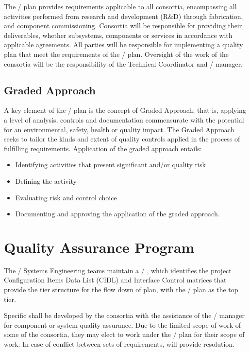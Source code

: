 The /  plan provides   requirements
applicable to all consortia, encompassing all activities performed
from research and development (R\&D) through fabrication, and component
commissioning. Consortia will be responsible for providing their
deliverables, whether subsystems, components or services in accordance
with applicable agreements. All parties will be responsible for
implementing a quality plan that meet the requirements of the
/  plan. Oversight of the work of the consortia will be
the responsibility of the  Technical Coordinator and /  manager.

\subsection{Graded Approach}

A key element of the /  plan is the concept of Graded
Approach; that is, applying a level of analysis, controls and
documentation commensurate with the potential for an environmental,
safety, health or quality impact. The Graded Approach seeks to tailor
the kinds and extent of quality controls applied in the process of
fulfilling requirements. Application of the graded approach entails:
\begin{itemize}
 \item Identifying activities that present significant  and/or quality risk
 \item Defining the activity
 \item Evaluating risk and control choice
 \item Documenting and approving the application of the graded approach.
\end{itemize}

\section{Quality Assurance Program}

The / Systems Engineering teams maintain a /
, which identifies the project
Configuration Items Data List (CIDL) and Interface Control matrices
that provide the tier structure for the flow down of  plan, with
the /  plan as the top tier.

Specific  shall be developed by the consortia with the
assistance of the /  manager for
component or system quality assurance. Due to the limited scope of
work of some of the consortia, they may elect to work under the
/  plan for their scope of work. In case of conflict between
sets of   requirements,   will provide
resolution.

